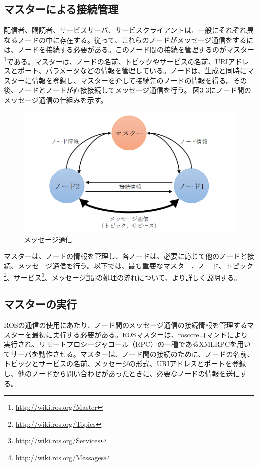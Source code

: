 \subsection{マスターによる接続管理}
配信者、購読者、サービスサーバ、サービスクライアントは、一般にそれぞれ異なるノードの中に存在する。従って、これらのノードがメッセージ通信をするには、ノードを接続する必要がある。このノード間の接続を管理するのがマスター\footnote{\url{http://wiki.ros.org/Master}}である。マスターは、ノードの名前、トピックやサービスの名前、URIアドレスとポート、パラメータなどの情報を管理している。ノードは、生成と同時にマスターに情報を登録し、マスターを介して接続先のノードの情報を得る。その後、ノードとノードが直接接続してメッセージ通信を行う。
図3-3にノード間のメッセージ通信の仕組みを示す。

\begin{figure}[h]
  \centering
  \includegraphics[width=12cm]{pictures/chapter3/pic_03_03.png}
  \caption{メッセージ通信}
\end{figure}

マスターは、ノードの情報を管理し、各ノードは、必要に応じて他のノードと接続、メッセージ通信を行う。以下では、最も重要なマスター、ノード、トピック\footnote{\url{http://wiki.ros.org/Topics}}、サービス\footnote{\url{http://wiki.ros.org/Services}}、メッセージ\footnote{\url{http://wiki.ros.org/Messages}}間の処理の流れについて、より詳しく説明する。

\subsection{マスターの実行}

ROSの通信の使用にあたり、ノード間のメッセージ通信の接続情報を管理するマスターを最初に実行する必要がある。ROSマスターは、roscoreコマンドにより実行され、リモートプロシージャコール（RPC）の一種であるXMLRPCを用いてサーバを動作させる。マスターは、ノード間の接続のために、ノードの名前、トピックとサービスの名前、メッセージの形式、URIアドレスとポートを登録し、他のノードから問い合わせがあったときに、必要なノードの情報を送信する。

